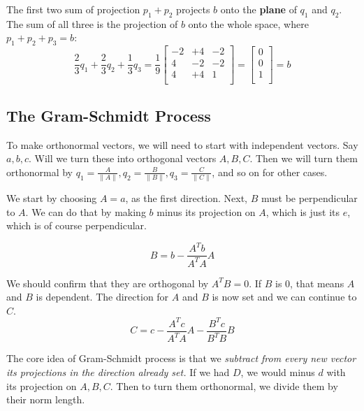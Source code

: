The first two sum of projection \(p_1 + p_2\) projects \(b\) onto the \textbf{plane} of \(q_1\) and \(q_2\). The sum of all three is the projection of \(b\) onto the whole space, where \(p_1 + p_2 + p_3 = b\):
\[
    \frac{2}{3}q_1 + \frac{2}{3}q_2 + \frac{1}{3}q_3
    = \frac{1}{9}
    \begin{bmatrix}
        -2 & +4 & -2  \\
        4 & -2 & -2  \\
        4 & +4 & 1  \\
    \end{bmatrix}
    = 
    \begin{bmatrix}
         0 \\
         0 \\
         1 \\
    \end{bmatrix}
    = b 
\]      

\subsection{The Gram-Schmidt Process}

To make orthonormal vectors, we will need to start with independent vectors. Say \(a, b , c\). Will we turn these into orthogonal vectors \(A, B, C\). Then we will turn them orthonormal by \(q_1 = \frac{A}{\lVert A \rVert }, q_2 = \frac{B}{\lVert B \rVert }, q_3 = \frac{C}{\lVert C \rVert }\), and so on for other cases. 

We start by choosing \(A = a\), as the first direction. Next, \(B\) must be perpendicular to \(A\). We can do that by making \(b\) minus its projection on \(A\), which is just its \(e\), which is of course perpendicular. 

\[
    B = b - \frac{A^T b}{A^T A}A
\]

We should confirm that they are orthogonal by \(A^T B = 0\). If \(B\) is 0, that means \(A\) and \(B\) is dependent. The direction for \(A\) and \(B\) is now set and we can continue to \(C\). 
\[
    C = c - \frac{A^T c}{A^T A}A - \frac{B^T c}{B^T B}B
\]     

The core idea of Gram-Schmidt process is that we \emph{subtract from every new vector its projections in the direction already set.} If we had \(D\), we would minus \(d\)  with its projection on \(A, B, C\). Then to turn them orthonormal, we divide them by their norm length.

